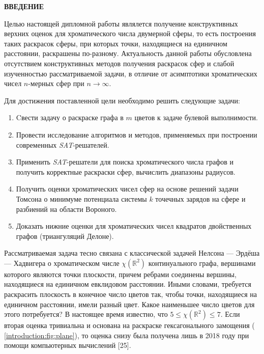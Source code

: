 \newpage
\begin{center}
\noindent\textbf{ВВЕДЕНИЕ}\label{chapters:introduction}
\vspace{1.5mm}
\end{center}

Целью настоящей дипломной работы являлется получение конструктивных верхних оценок для хроматического числа двумерной сферы, 
то есть построения таких раскрасок сферы, при которых точки, находящиеся на единичном расстоянии, раскрашены по-разному. 
Актуальность данной работы обусловлена отсутствием конструктивных методов получения раскрасок сфер и слабой изученностью рассматриваемой задачи, в отличие от асимптотики хроматических чисел $n$-мерных сфер при $n\to\infty$.

Для достижения поставленной цели необходимо решить следующие задачи:

\begin{enumerate}[leftmargin=1cm,topsep=0pt,itemsep=-1ex,partopsep=1ex,parsep=1ex,label=\arabic{*}.]

\item Cвести задачу о раскраске графа в $m$ цветов к задаче булевой выполнимости.
\item Провести исследование алгоритмов и методов, применяемых при построении современных \textit{SAT}-решателей.
\item Применить \textit{SAT}-решатели для поиска хроматического числа графов и получить корректные раскраски сфер, вычислить диапазоны радиусов.
\item Получить оценки хроматических чисел сфер на основе решений задачи Томсона о минимуме потенциала системы $k$ точечных зарядов на сфере и разбиений на области Вороного.
\item Доказать нижние оценки для хроматических чисел квадратов двойственных графов (триангуляций Делоне).

\end{enumerate}

Рассматриваемая задача тесно связана с классической задачей Нелсона — Эрдёша — Хадвигера о хроматическом числе $\chi(\mathbb{R}^2)$ континуального графа, вершинами которого являются точки плоскости, причем ребрами соединены вершины, находящиеся на единичном евклидовом расстоянии. Иными словами, требуется раскрасить плоскость в конечное число цветов так, чтобы точки, находящиеся на единичном расстоянии, имели разный цвет. Какое наименьшее число цветов для этого потребуется? В настоящее время известно, что $5 \leq \chi(\mathbb{R}^2) \leq 7$. Если вторая оценка тривиальна и основана на раскраске гексагонального замощения (\figurename{ \ref{introduction:fig:plane}}), то оценка снизу была получена лишь в 2018 году при помощи компьютерных вычислений [25]. 

